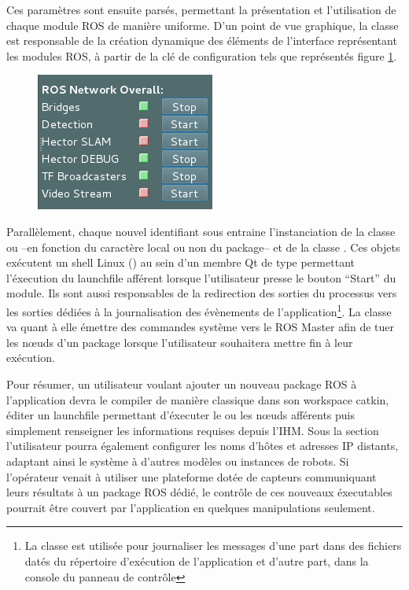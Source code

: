 Ces paramètres sont ensuite parsés, permettant la présentation et l'utilisation de chaque module ROS de manière uniforme.
D'un point de vue graphique, la classe  est responsable de la création dynamique des éléments de l'interface représentant les modules ROS, à partir de la clé de configuration  
tels que représentés figure \ref{fig:guicontrols}.

\begin{figure}
  \centering
    \includegraphics[width=.3\linewidth]{figures/guicontrols}  
  \label{fig:guicontrols}
\end{figure}

Parallèlement, chaque nouvel identifiant sous  entraine l'instanciation de la classe  ou  --en fonction du caractère local ou non du package-- et de la classe 
. 
Ces objets exécutent un shell Linux () au sein d'un membre Qt de type  permettant l'éxecution du launchfile afférent lorsque l'utilisateur presse le bouton ``Start'' du module.
Ils sont aussi responsables de la redirection des sorties du processus vers les sorties dédiées à la journalisation des évènements de l'application\footnote{La classe  est utilisée pour journaliser les messages d'une part dans des fichiers datés du répertoire d'exécution 
de l'application et d'autre part, dans la console du panneau de contrôle}. 
La classe  va quant à elle émettre des commandes système vers le ROS Master afin de tuer les n\oe{}uds d'un package lorsque l'utilisateur souhaitera mettre fin à leur exécution. 

Pour résumer, un utilisateur voulant ajouter un nouveau package ROS à l'application devra le compiler de manière classique dans son workspace catkin, éditer un launchfile permettant d'éxecuter le ou les n\oe{}uds afférents puis
simplement renseigner les informations requises depuis l'IHM. 
Sous la section  l'utilisateur pourra également configurer les noms d'hôtes et adresses IP distants, adaptant ainsi le système à d'autres modèles ou instances de robots. 
Si l'opérateur venait à utiliser une plateforme dotée de capteurs communiquant leurs résultats à un package ROS dédié, le contrôle de ces nouveaux éxecutables pourrait être couvert par l'application en quelques manipulations seulement.  